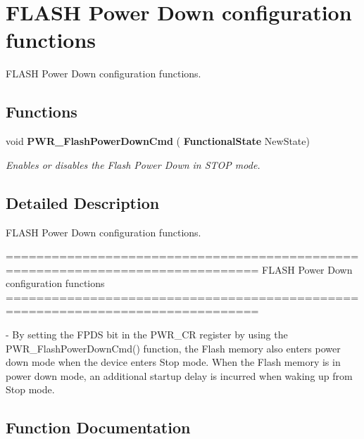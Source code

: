 \section{F\+L\+A\+SH Power Down configuration functions}
\label{group__PWR__Group5}


F\+L\+A\+SH Power Down configuration functions.  


\subsection*{Functions}
\begin{DoxyCompactItemize}
\item 
void \textbf{ P\+W\+R\+\_\+\+Flash\+Power\+Down\+Cmd} (\textbf{ Functional\+State} New\+State)
\begin{DoxyCompactList}\small\item\em Enables or disables the Flash Power Down in S\+T\+OP mode. \end{DoxyCompactList}\end{DoxyCompactItemize}


\subsection{Detailed Description}
F\+L\+A\+SH Power Down configuration functions. 

\begin{DoxyVerb} ===============================================================================
           FLASH Power Down configuration functions
 ===============================================================================  

 - By setting the FPDS bit in the PWR_CR register by using the PWR_FlashPowerDownCmd()
   function, the Flash memory also enters power down mode when the device enters 
   Stop mode. When the Flash memory is in power down mode, an additional startup 
   delay is incurred when waking up from Stop mode.\end{DoxyVerb}
 

\subsection{Function Documentation}
\mbox{\label{group__PWR__Group5_gaf0af19a9fdf0324f2ada60c9bce1aab5}} 
